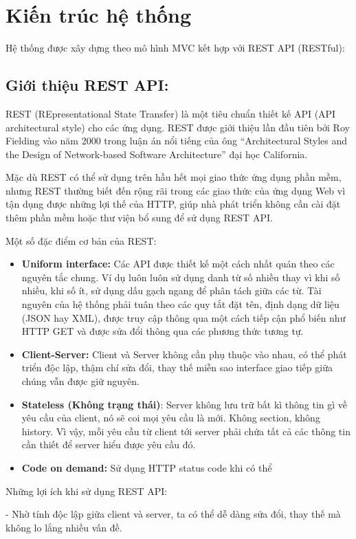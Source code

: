 \section{Kiến trúc hệ thống}
\indent Hệ thống được xây dựng theo mô hình MVC kết hợp với REST API (RESTful):
\subsection{Giới thiệu REST API:}
REST (REpresentational State Transfer) là một tiêu chuẩn thiết kế API (API architectural style) cho các ứng dụng. REST được giới thiệu lần đầu tiên bởi Roy Fielding vào năm 2000 trong luận án nổi tiếng của ông ``Architectural Styles and
the Design of Network-based Software Architecture'' đại học California.

Mặc dù REST có thể sử dụng trên hầu hết mọi giao thức ứng dụng phần mềm, nhưng REST thường biết đến rộng rãi trong các giao thức của ứng dụng Web vì tận dụng được những lợi thế của HTTP, giúp nhà phát triển không cần cài đặt thêm phần mềm hoặc thư viện bổ sung để sử dụng REST API.

Một số đặc điểm cơ bản của REST:
\begin{itemize}
    \item \textbf{Uniform interface:} Các API được thiết kế một cách nhất quán theo các nguyên tắc chung. Ví dụ luôn luôn sử dụng danh từ số nhiều thay vì khi số nhiều, khi số ít, sử dụng dấu gạch ngang để phân tách giữa các từ. Tài nguyên của hệ thống phải tuân theo các quy tắt đặt tên, định dạng dữ liệu (JSON hay XML), được truy cập thông qua một cách tiếp cận phổ biến như HTTP GET và được sửa đổi thông qua các phương thức tương tự.
    \item \textbf{Client-Server:} Client và Server không cần phụ thuộc vào nhau, có thể phát triển độc lập, thậm chí sửa đổi, thay thế miễn sao interface giao tiếp giữa chúng vẫn được giữ nguyên.
    \item \textbf{Stateless (Không trạng thái)}: Server không lưu trữ bất kì thông tin gì về yêu cầu của client, nó sẽ coi mọi yêu cầu là mới. Không section, không history. Vì vậy, mỗi yêu cầu từ client tới server phải chứa tất cả các thông tin cần thiết để  server hiểu được yêu cầu đó.
    \item \textbf{Code on demand:} Sử dụng HTTP status code khi có thể
\end{itemize}


Những lợi ích khi sử dụng REST API:

- Nhờ tính độc lập giữa client và server, ta có thể dễ dàng sửa đổi, thay thế mà không lo lắng nhiều vấn đề.

